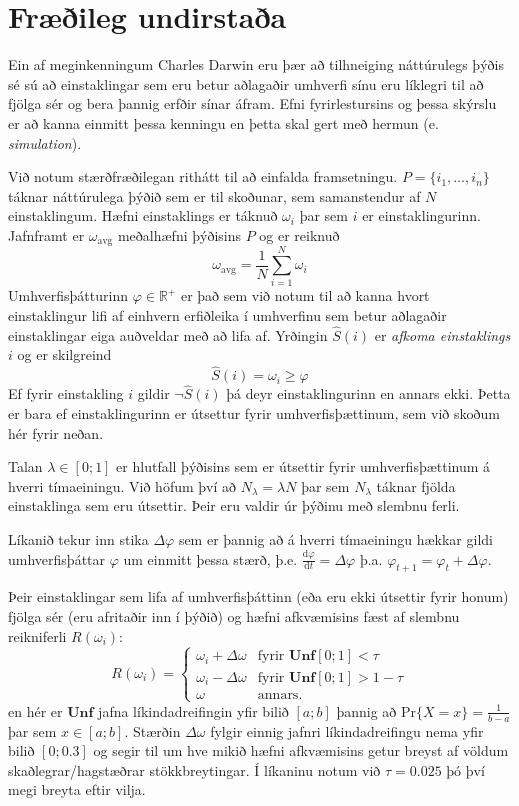 \documentclass[12pt]{article}
\begin{document}
\section{Fræðileg undirstaða}
Ein af meginkenningum Charles Darwin eru þær að tilhneiging náttúrulegs þýðis sé sú að einstaklingar
sem eru betur aðlagaðir umhverfi sínu eru líklegri til að fjölga sér og bera þannig erfðir sínar áfram.
Efni fyrirlestursins og þessa skýrslu er að kanna einmitt þessa kenningu en þetta skal gert með hermun (e. \emph{simulation}).
\par Við notum stærðfræðilegan rithátt til að einfalda framsetningu. $P = \{i_1, \ldots, i_n\}$ táknar náttúrulega þýðið sem er til skoðunar, sem samanstendur
af $N$ einstaklingum. Hæfni einstaklings er táknuð $\omega_i$ þar sem $i$ er einstaklingurinn. Jafnframt er $\omega_{\mathrm{avg}}$ meðalhæfni
þýðisins $P$ og er reiknuð
\[
    \omega_{\mathrm{avg}} = \frac 1N \sum_{i = 1}^N \omega_i
\]
Umhverfisþátturinn $\varphi \in \mathbb R^+$ er það sem við notum til að kanna hvort einstaklingur lifi af einhvern erfiðleika í umhverfinu
sem betur aðlagaðir einstaklingar eiga auðveldar með að lifa af. Yrðingin $\hat S(i)$ er \emph{afkoma einstaklings} $i$ og er skilgreind
\[
    \hat S(i) = \omega_i \geq \varphi
\]
Ef fyrir einstakling $i$ gildir $\lnot \hat S(i)$ þá deyr einstaklingurinn en annars ekki. Þetta er bara ef einstaklingurinn er
útsettur fyrir umhverfisþættinum, sem við skoðum hér fyrir neðan.
\par Talan $\lambda \in [0;1]$ er hlutfall þýðisins sem er útsettir fyrir umhverfisþættinum á hverri tímaeiningu. Við höfum því að
$N_\lambda = \lambda N$ þar sem $N_\lambda$ táknar fjölda einstaklinga sem eru útsettir. Þeir eru valdir úr þýðinu með slembnu ferli.
\par Líkanið tekur inn stika $\Delta \varphi$ sem er þannig að á hverri tímaeiningu hækkar gildi umhverfisþáttar $\varphi$ um einmitt þessa
stærð, þ.e. $\frac{\mathrm d \varphi}{\mathrm dt} = \Delta \varphi$ þ.a. $\varphi_{t + 1} = \varphi_t + \Delta \varphi$.
\par Þeir einstaklingar sem lifa af umhverfisþáttinn (eða eru ekki útsettir fyrir honum) fjölga sér (eru afritaðir inn í þýðið) og hæfni afkvæmisins fæst
af slembnu reikniferli $R(\omega_i)$:
\[
    R(\omega_i) = \begin{cases}
        \omega_i + \Delta \omega   & \text{fyrir $\textbf{Unf}[0;1] < \tau$} \\
        \omega_i - \Delta \omega   & \text{fyrir $\textbf{Unf}[0;1] > 1 - \tau$} \\
        \omega                     & \text{annars.}
    \end{cases}
\]
en hér er $\textbf{Unf}$ jafna líkindadreifingin yfir bilið $[a;b]$ þannig að $\mathrm{Pr}\{X = x\} = \frac{1}{b - a}$ þar sem $x \in [a;b]$. Stærðin
$\Delta \omega$ fylgir einnig jafnri líkindadreifingu nema yfir bilið $[0;0.3]$ og segir til um hve mikið hæfni afkvæmisins getur breyst af völdum
skaðlegrar/hagstæðrar stökkbreytingar. Í líkaninu notum við $\tau = 0.025$ þó því megi breyta eftir vilja.
\end{document}
